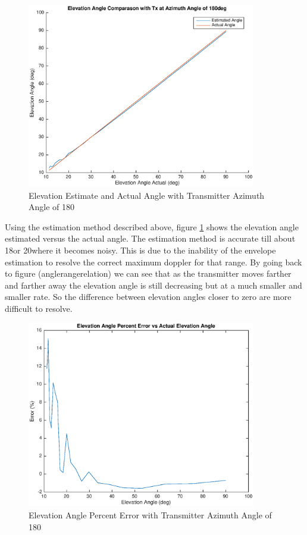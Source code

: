 \begin{figure}
	\begin{center}
		\includegraphics[width=10cm]{images/results/Elevation_angle_comparason_180deg_Azimuth.eps}
		\caption{Elevation Estimate and Actual Angle with Transmitter Azimuth Angle of 180\textdegree}
		\label{fig:angle_comparason_180deg}
	\end{center}
\end{figure}

Using the estimation method described above, figure \ref{fig:angle_comparason_180deg} shows the elevation angle estimated versus the actual angle. The estimation method is accurate till about 18\textdegree \space or 20\textdegree \space where it becomes noisy. This is due to the inability of the envelope estimation to resolve the correct maximum doppler for that range. By going back to figure (anglerangerelation) we can see that as the transmitter moves farther and farther away the elevation angle is still decreasing but at a much smaller and smaller rate. So the difference between elevation angles closer to zero are more difficult to resolve. 

\begin{figure}
	\begin{center}
		\includegraphics[width=10cm]{images/results/Elevation_angle_percent_error_180deg_Azimuth.eps}
		\caption{Elevation Angle Percent Error with Transmitter Azimuth Angle of 180\textdegree}
		\label{fig:percent_error_elevation_180deg}
	\end{center}
\end{figure}

